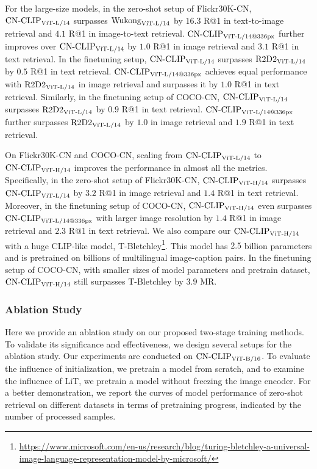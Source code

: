 For the large-size models, in the zero-shot setup of Flickr30K-CN, $\text{CN-CLIP}\rm_{ViT\text{-}L/14}$ surpasses $\text{Wukong}\rm_{ViT\text{-}L/14}$ by $16.3$ R@1 in text-to-image retrieval and $4.1$ R@1 in image-to-text retrieval. $\text{CN-CLIP}\rm_{ViT\text{-}L/14@336px}$ further improves over $\text{CN-CLIP}\rm_{ViT\text{-}L/14}$ by $1.0$ R@1 in image retrieval and $3.1$ R@1 in text retrieval. In the finetuning setup, $\text{CN-CLIP}\rm_{ViT\text{-}L/14}$ surpasses $\text{R2D2}\rm_{ViT\text{-}L/14}$ by $0.5$ R@1 in text retrieval. $\text{CN-CLIP}\rm_{ViT\text{-}L/14@336px}$ achieves equal performance with $\text{R2D2}\rm_{ViT\text{-}L/14}$ in image retrieval and surpasses it by $1.0$ R@1 in text retrieval. Similarly, in the finetuning setup of COCO-CN, $\text{CN-CLIP}\rm_{ViT\text{-}L/14}$ surpasses $\text{R2D2}\rm_{ViT\text{-}L/14}$ by $0.9$ R@1 in text retrieval. $\text{CN-CLIP}\rm_{ViT\text{-}L/14@336px}$ further surpasses $\text{R2D2}\rm_{ViT\text{-}L/14}$ by $1.0$ in image retrieval and $1.9$ R@1 in text retrieval. 

On Flickr30K-CN and COCO-CN, scaling from $\text{CN-CLIP}\rm_{ViT\text{-}L/14}$ to $\text{CN-CLIP}\rm_{ViT\text{-}H/14}$ improves the performance in almost all the metrics. Specifically, in the zero-shot setup of Flickr30K-CN, $\text{CN-CLIP}\rm_{ViT\text{-}H/14}$ surpasses $\text{CN-CLIP}\rm_{ViT\text{-}L/14}$ by $3.2$ R@1 in image retrieval and $1.4$ R@1 in text retrieval. Moreover, in the finetuning setup of COCO-CN, $\text{CN-CLIP}\rm_{ViT\text{-}H/14}$ even surpasses $\text{CN-CLIP}\rm_{ViT\text{-}L/14@336px}$ with larger image resolution by $1.4$ R@1 in image retrieval and $2.3$ R@1 in text retrieval. 
We also compare our $\text{CN-CLIP}\rm_{ViT\text{-}H/14}$ with a huge CLIP-like model, T-Bletchley\footnote{\url{https://www.microsoft.com/en-us/research/blog/turing-bletchley-a-universal-image-language-representation-model-by-microsoft/}}. This model has $2.5$ billion parameters and is pretrained on billions of multilingual image-caption pairs. In the finetuning setup of COCO-CN, with smaller sizes of model parameters and pretrain dataset, $\text{CN-CLIP}\rm_{ViT\text{-}H/14}$ still surpasses T-Bletchley by $3.9$ MR.


\subsubsection{Ablation Study}
Here we provide an ablation study on our proposed two-stage training methods. 
To validate its significance and effectiveness, we design several setups for the ablation study. 
Our experiments are conducted on $\text{CN-CLIP}\rm_{ViT\text{-}B/16}$. 
To evaluate the influence of initialization, we pretrain a model from scratch, and to examine the influence of LiT, we pretrain a model without freezing the image encoder. 
For a better demonstration, we report the curves of model performance of zero-shot retrieval on different datasets in terms of pretraining progress, indicated by the number of processed samples. 

